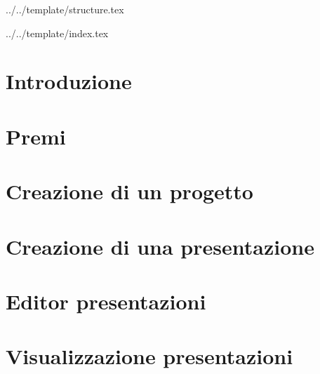 

\def\DOCUMENTO{Manuale Utente}
\def\VERSIONE{1.0.0}

\def\DESCRIZIONE{Documento che facilita l'utilizzo dell'applicazione da parte dell'utente.}

\def\REDATTORE {Crespan Emanuele}
\def\VERIFICATORE {Agostinetto Matteo}
\def\RESPONSABILE {Suierica Bogdan}

\def\USO {Esterno}

\def\DISTRIBUZIONE {\GRUPPO{}\\ & \COMMITTENTE{}\\ & Piccoli Gregorio, \textit{Zucchetti spa}\\}


\def\INDICE	{true}
\def\TABELLE {true}
\def\FIGURE {true}


 {../../template/structure.tex}


 {../../template/index.tex}

\section{Introduzione}

\newpage

\section{Premi}

\newpage

\section{Creazione di un progetto}

\newpage

\section{Creazione di una presentazione}

\newpage

\section{Editor presentazioni}

\newpage


\section{Visualizzazione presentazioni}

\newpage






